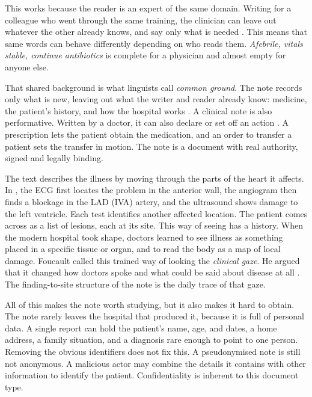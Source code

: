\begin{reviewread}
This works because the reader is an expert of the same domain.
Writing for a colleague who went through the same training, the clinician can leave out whatever the other already knows, and say only what is needed \citep{grice_logic_1975,sperber_relevance_1995}.
This means that same words can behave differently depending on who reads them.
\emph{Afebrile, vitals stable, continue antibiotics} is complete for a physician and almost empty for anyone else.
\end{reviewread}

\begin{reviewread}
That shared background is what linguists call \emph{common ground}.
The note records only what is new, leaving out what the writer and reader already know: medicine, the patient's history, and how the hospital works \citep{stalnaker_common_2002}.
A clinical note is also performative.
Written by a doctor, it can also declare or set off an action \citep{austin_words_1962,searle_speech_1969}.
A prescription lets the patient obtain the medication, and an order to transfer a patient sets the transfer in motion.
The note is a document with real authority, signed and legally binding.
\end{reviewread}

\begin{reviewread}
The text describes the illness by moving through the parts of the heart it affects.
In , the ECG first locates the problem in the anterior wall, the angiogram then finds a blockage in the LAD (IVA) artery, and the ultrasound shows damage to the left ventricle.
Each test identifies another affected location.
The patient comes across as a list of lesions, each at its site.
This way of seeing has a history.
When the modern hospital took shape, doctors learned to see illness as something placed in a specific tissue or organ, and to read the body as a map of local damage.
Foucault called this trained way of looking the \emph{clinical gaze}.
He argued that it changed how doctors spoke and what could be said about disease at all \citep{foucault_clinique_1963}.
The finding-to-site structure of the note is the daily trace of that gaze.
\end{reviewread}

\begin{reviewread}
All of this makes the note worth studying, but it also makes it hard to obtain.
The note rarely leaves the hospital that produced it, because it is full of personal data.
A single report can hold the patient's name, age, and dates, a home address, a family situation, and a diagnosis rare enough to point to one person.
Removing the obvious identifiers does not fix this.
A pseudonymised note is still not anonymous.
A malicious actor may combine the details it contains with other information to identify the patient.
Confidentiality is inherent to this document type.
\end{reviewread}

